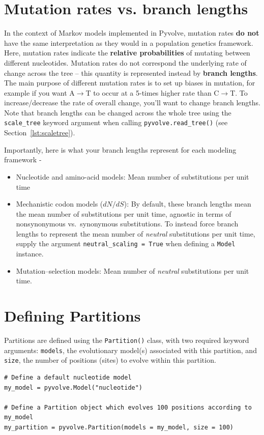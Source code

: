 \documentclass{article}
\newcommand{\code}[1]{\texttt{\small{#1}}}
\begin{document}
\section{Mutation rates vs. branch lengths}

In the context of Markov models implemented in Pyvolve, mutation rates \textbf{do not} have the same interpretation as they would in a population genetics framework. Here, mutation rates indicate the \textbf{relative probabilities} of mutating between different nucleotides. Mutation rates do not correspond the underlying rate of change across the tree -- this quantity is represented instead by \textbf{branch lengths}. The main purpose of different mutation rates is to set up biases in mutation, for example if you want A$\rightarrow$T to occur at a 5-times higher rate than C$\rightarrow$T. To increase/decrease the rate of overall change, you'll want to change branch lengths. Note that branch lengths can be changed across the whole tree using the \code{scale\_tree} keyword argument when calling \code{pyvolve.read\_tree()} (see Section~\ref{lst:scaletree}).

Importantly, here is what your branch lengths represent for each modeling framework -
\begin{itemize}
	\item{Nucleotide and amino-acid models}: Mean number of substitutions per unit time
	\item{Mechanistic codon models ($dN/dS$)}: By default, these branch lengths mean the mean number of substitutions per unit time, agnostic in terms of nonsynonymous vs.\ synonymous substitutions. To instead force branch lengths to represent the mean number of \emph{neutral} substitutions per unit time, supply the argument \code{neutral\_scaling = True} when defining a \code{Model} instance.
	\item{Mutation--selection models}: Mean number of \emph{neutral} substitutions per unit time.
\end{itemize}



\section{Defining Partitions}\label{sec:partitions}

Partitions are defined using the \code{Partition()} class, with two required keyword arguments: \code{models}, the evolutionary model(s) associated with this partition, and \code{size}, the number of positions (sites) to evolve within this partition.
\begin{lstlisting}
# Define a default nucleotide model
my_model = pyvolve.Model("nucleotide")

# Define a Partition object which evolves 100 positions according to my_model
my_partition = pyvolve.Partition(models = my_model, size = 100)
\end{lstlisting}
\end{document}
